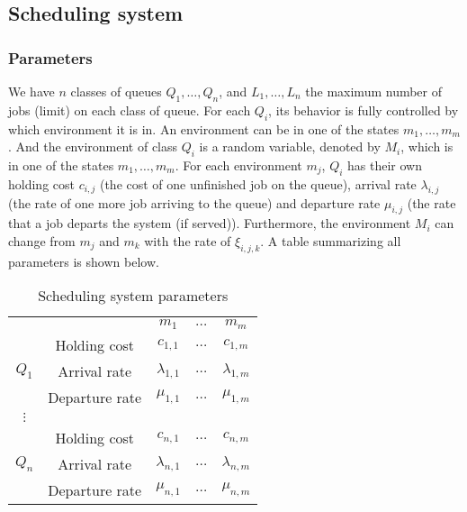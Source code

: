 \documentclass[
  a4paper, xcolor = usenames,dvipsnames]{article}
\theoremstyle{definition}
\theoremstyle{definition}
\theoremstyle{definition}
\theoremstyle{definition}
\theoremstyle{remark}
\begin{document}
\hypertarget{scheduling-system}{%
\subsection{Scheduling system}\label{scheduling-system}}

\hypertarget{parameters}{%
\subsubsection{Parameters}\label{parameters}}

We have \(n\) classes of queues \(Q_{1}, \dots, Q_{n}\), and \(L_{1}, \dots, L_{n}\) the maximum number of jobs (limit) on each class of queue. For each \(Q_{i}\), its behavior is fully controlled by which environment it is in. An environment can be in one of the states \(m_{1}, \dots, m_{m}\). And the environment of class \(Q_{i}\) is a random variable, denoted by \(M_{i}\), which is in one of the states \(m_{1}, \dots, m_{m}\). For each environment \(m_{j}\), \(Q_{i}\) has their own holding cost \(c_{i, j}\) (the cost of one unfinished job on the queue), arrival rate \(\lambda_{i, j}\) (the rate of one more job arriving to the queue) and departure rate \(\mu_{i, j}\) (the rate that a job departs the system (if served)). Furthermore, the environment \(M_{i}\) can change from \(m_{j}\) and \(m_{k}\) with the rate of \(\xi_{i, j, k}\). A table summarizing all parameters is shown below.

\begin{table}[!htbp]
\caption{Scheduling system parameters}
\begin{center}
\begin{tabular}{c c c c c}
    \hline
    \multicolumn{2}{c}{} & $m_{1}$ & $\dots$ & $m_{m}$ \\
    \cline{2-5}
    \multirow{3}{*}{$Q_{1}$} &  Holding cost & $c_{1, 1}$ & $\dots$ & $c_{1, m}$ \\
    & Arrival rate & $\lambda_{1, 1}$ & $\dots$ & $\lambda_{1, m}$ \\
    & Departure rate & $\mu_{1, 1}$ & $\dots$ & $\mu_{1, m}$ \\
    \cline{2-5}
    $\vdots$  \\
    \cline{2-5}
    \multirow{3}{*}{$Q_{n}$} &  Holding cost & $c_{n, 1}$ & $\dots$ & $c_{n, m}$ \\
    & Arrival rate & $\lambda_{n, 1}$ & $\dots$ & $\lambda_{n, m}$ \\
    & Departure rate & $\mu_{n, 1}$ & $\dots$ & $\mu_{n, m}$ \\
    \hline
\end{tabular}
\end{center}
\label{tab:qs-param}
\end{table}
\end{document}
